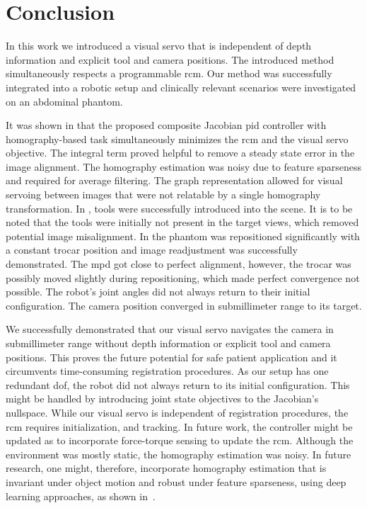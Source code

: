 \section{Conclusion}
\label{c2:sec:conclusions}
In this work we introduced a visual servo that is independent of depth information and explicit tool and camera positions. The introduced method simultaneously respects a programmable \acrshort{rcm}. Our method was successfully integrated into a robotic setup and clinically relevant scenarios were investigated on an abdominal phantom.

It was shown in  that the proposed composite Jacobian \acrshort{pid} controller with homography-based task simultaneously minimizes the \acrshort{rcm} and the visual servo objective. The integral term proved helpful to remove a steady state error in the image alignment. The homography estimation was noisy due to feature sparseness and required for average filtering. The graph representation allowed for visual servoing between images that were not relatable by a single homography transformation. In , tools were successfully introduced into the scene. It is to be noted that the tools were initially not present in the target views, which removed potential image misalignment. In  the phantom was repositioned significantly with a constant trocar position and image readjustment was successfully demonstrated. The \acrshort{mpd} got close to perfect alignment, however, the trocar was possibly moved slightly during repositioning, which made perfect convergence not possible. The robot's joint angles did not always return to their initial configuration. The camera position converged in submillimeter range to its target.

We successfully demonstrated that our visual servo navigates the camera in submillimeter range without depth information or explicit tool and camera positions. This proves the future potential for safe patient application and it circumvents time-consuming registration procedures. As our setup has one redundant \acrshort{dof}, the robot did not always return to its initial configuration. This might be handled by introducing joint state objectives to the Jacobian's nullspace. While our visual servo is independent of registration procedures, the \acrshort{rcm} requires initialization, and tracking. In future work, the controller might be updated as to incorporate force-torque sensing to update the \acrshort{rcm}. Although the environment was mostly static, the homography estimation was noisy. In future research, one might, therefore, incorporate homography estimation that is invariant under object motion and robust under feature sparseness, using deep learning approaches, as shown in~\cite{huber2022deep}.
